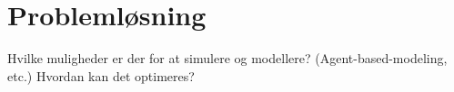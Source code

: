 \chapter{Problemløsning}\label{ch:problemloesning}

Hvilke muligheder er der for at simulere og modellere? (Agent-based-modeling, etc.)
Hvordan kan det optimeres?
